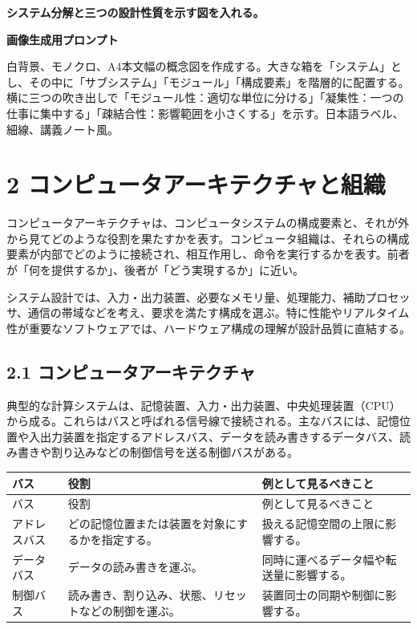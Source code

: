 \documentclass[a4paper,11pt]{ltjsarticle}
\begin{document}
\begin{todobox}
\textbf{システム分解と三つの設計性質を示す図を入れる。}\par
\textbf{画像生成用プロンプト}\par
白背景、モノクロ、A4本文幅の概念図を作成する。大きな箱を「システム」とし、その中に「サブシステム」「モジュール」「構成要素」を階層的に配置する。横に三つの吹き出しで「モジュール性：適切な単位に分ける」「凝集性：一つの仕事に集中する」「疎結合性：影響範囲を小さくする」を示す。日本語ラベル、細線、講義ノート風。

\end{todobox}

\section{2 コンピュータアーキテクチャと組織}

コンピュータアーキテクチャは、コンピュータシステムの構成要素と、それが外から見てどのような役割を果たすかを表す。コンピュータ組織は、それらの構成要素が内部でどのように接続され、相互作用し、命令を実行するかを表す。前者が「何を提供するか」、後者が「どう実現するか」に近い。

システム設計では、入力・出力装置、必要なメモリ量、処理能力、補助プロセッサ、通信の帯域などを考え、要求を満たす構成を選ぶ。特に性能やリアルタイム性が重要なソフトウェアでは、ハードウェア構成の理解が設計品質に直結する。

\subsection{2.1 コンピュータアーキテクチャ}

典型的な計算システムは、記憶装置、入力・出力装置、中央処理装置（CPU）から成る。これらはバスと呼ばれる信号線で接続される。主なバスには、記憶位置や入出力装置を指定するアドレスバス、データを読み書きするデータバス、読み書きや割り込みなどの制御信号を送る制御バスがある。

\begin{longtable}{>{\raggedright\arraybackslash}p{}>{\raggedright\arraybackslash}p{}>{\raggedright\arraybackslash}p{}}
\toprule
バス & 役割 & 例として見るべきこと \\
\midrule
\endfirsthead
\toprule
バス & 役割 & 例として見るべきこと \\
\midrule
\endhead
アドレスバス & どの記憶位置または装置を対象にするかを指定する。 & 扱える記憶空間の上限に影響する。 \\
データバス & データの読み書きを運ぶ。 & 同時に運べるデータ幅や転送量に影響する。 \\
制御バス & 読み書き、割り込み、状態、リセットなどの制御を運ぶ。 & 装置同士の同期や制御に影響する。 \\
\bottomrule
\end{longtable}
\end{document}
